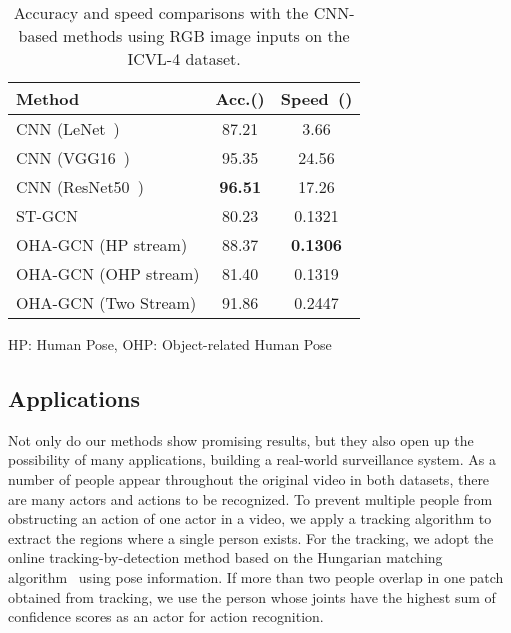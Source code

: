\documentclass[10pt,twocolumn,letterpaper]{article}
\begin{document}
\begin{table}
\caption{Accuracy and speed comparisons with the CNN-based methods using RGB image inputs on the ICVL-4 dataset.}
\vspace{3mm}
\centering
\begin{tabular}{p{4cm}|cc} 

\hline 

Method & Acc.() & Speed~()  \\ \hline 

CNN (LeNet~\cite{lecun1998gradient}) &  87.21 &  3.66 \\ 
CNN (VGG16~\cite{simonyan2014very}) &  95.35 &  24.56  \\ 
CNN (ResNet50~\cite{he2016deep}) &  \textbf{96.51} & 17.26 \\  \hline
ST-GCN~\cite{stgcn2018aaai} & 80.23 & 0.1321 \\ \hline
OHA-GCN (HP stream) & 88.37 & \textbf{0.1306} \\ 
OHA-GCN (OHP stream) & 81.40 & 0.1319 \\ 
OHA-GCN (Two Stream) & 91.86  & 0.2447 \\ \hline 
\end{tabular}
{HP: Human Pose, OHP: Object-related Human Pose}
\label{tabular:res_icvl}
\end{table}





\subsection{Applications}
\label{application}

Not only do our methods show promising results, but they also open up the possibility of many applications, building a real-world surveillance system. 
As a number of people appear throughout the original video in both datasets, there are many actors and actions to be recognized.
To prevent multiple people from obstructing an action of one actor in a video, we apply a tracking algorithm to extract the regions where a single person exists.
For the tracking, we adopt the online tracking-by-detection method based on the Hungarian matching algorithm~\cite{Yoo:2016cf} using pose information.
If more than two people overlap in one patch obtained from tracking, we use the person whose joints have the highest sum of confidence scores as an actor for action recognition.
\end{document}

